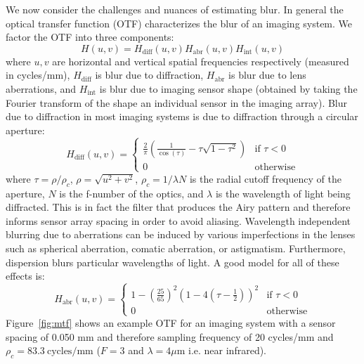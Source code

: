 We now consider the challenges and nuances of estimating blur.
%
In general the optical transfer function (OTF) characterizes the blur of an imaging system.
%
We factor the OTF into three components:
\begin{equation}
	H(u, v) = H_{\text{diff}}(u,v) H_{\text{abr}}(u,v) H_{\text{int}} (u,v)
\end{equation}
where $u,v$ are horizontal and vertical spatial frequencies respectively (measured in cycles/mm), $H_{\text{diff}}$ is blur due to diffraction, $H_{\text{abr}}$ is blur due to lens aberrations, and $H_{\text{int}}$ is blur due to imaging sensor shape (obtained by taking the Fourier transform of the shape an individual sensor in the imaging array).
%
Blur due to diffraction in most imaging systems is due to diffraction through a circular aperture\cite{goodman2005introduction}:
\begin{equation*}
	H_{\text{diff}}(u,v) =   \begin{cases}
		\frac{2}{\pi} \left(\frac{1}{\cos(\tau)} - \tau \sqrt{1-\tau^2}\right) & \text{if } \tau < 0 \\
		0                                                                      & \text{otherwise}
	\end{cases}
\end{equation*}
where $\tau = \rho/\rho_c$, $\rho=\sqrt{u^2 +v^2}$, $\rho_c = 1/\lambda N$ is the radial cutoff frequency of the aperture, $N$ is the f-number of the optics, and $\lambda$ is the wavelength of light being diffracted.
%
This is in fact the filter that produces the Airy pattern and therefore informs sensor array spacing in order to avoid aliasing.
%
Wavelength independent blurring due to aberrations can be induced by various imperfections in the lenses such as spherical aberration, comatic aberration, or astigmatism. Furthermore, dispersion blurs particular wavelengths of light. A good model for all of these effects is\cite{10.1117.12.946501}:
\begin{equation*}
	H_{\text{abr}}(u,v) =   \begin{cases}
		1-\left(\frac{25}{65}\right)^2 \left(1-4\left(\tau - \frac{1}{2}\right)\right)^2 & \text{if } \tau < 0 \\
		0                                                                                & \text{otherwise}
	\end{cases}
\end{equation*}
Figure~\ref{fig:mtf} shows an example OTF for an imaging system with a sensor spacing of 0.050 mm and therefore sampling frequency of 20 cycles/mm and $\rho_c = 83.3~\text{cycles}/\text{mm}$ ($F=3$ and $\lambda = 4\mu\text{m}$ i.e. near infrared).
